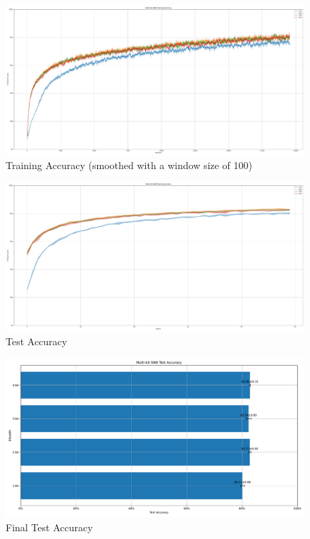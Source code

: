         \begin{figure}[H]
            \centering
            \includegraphics[width=\textwidth]{../standard/CIFAR10/plots/cifar10_train_acc.pdf}
            \caption{Training Accuracy (smoothed with a window size of 100)}
        \end{figure}
        \begin{figure}[H]
            \centering
            \includegraphics[width=\textwidth]{../standard/CIFAR10/plots/cifar10_test_acc.pdf}
            \caption{Test Accuracy}
        \end{figure}
        \begin{figure}[H]
            \centering
            \includegraphics[width=\textwidth]{../standard/CIFAR10/plots/cifar10_final_acc.pdf}
            \caption{Final Test Accuracy}
        \end{figure}

